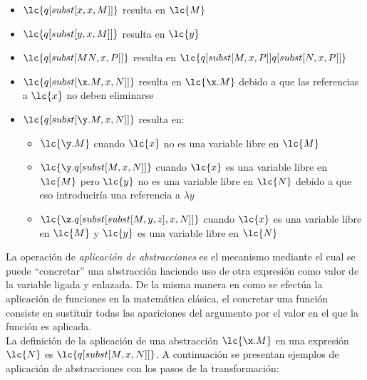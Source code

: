 \begin{itemize}
\item \(\lc{q[subst[x,x,M]]}\) resulta en \(\lc{M}\)
\item \(\lc{q[subst[y,x,M]]}\) resulta en \(\lc{y}\)
\item \(\lc{q[subst[M N, x, P]]}\) resulta en \(\lc{q[subst[M, x, P]] q[subst[N,
    x, P]]}\)
\item \(\lc{q[subst[\x.M, x, N]]}\) resulta en \(\lc{\x.M}\) debido a que las
  referencias a \(\lc{x}\) no deben eliminarse
\item \(\lc{q[subst[\y.M, x, N]]}\) resulta en:
  \begin{itemize}
  \item \(\lc{\y.M}\) cuando \(\lc{x}\) no es una variable libre en \(\lc{M}\)
  \item \(\lc{\y.q[subst[M, x, N]]}\) cuando \(\lc{x}\) es una variable libre en
    \(\lc{M}\) pero \(\lc{y}\) no es una variable libre en \(\lc{N}\) debido a que
    eso introduciría una referencia a \(\lambda y\)
  \item \(\lc{\z.q[subst[subst[M,y,z],x,N]]}\) cuando \(\lc{x}\) es una variable
    libre en \(\lc{M}\) y \(\lc{y}\) es una variable libre en \(\lc{N}\)
  \end{itemize}
\end{itemize}

La operación de \emph{aplicación de abstracciones} es el mecanismo mediante el cual
se puede ``concretar'' una abstracción haciendo uso de otra expresión como valor
de la variable ligada y enlazada. De la misma manera en como se efectúa la
aplicación de funciones en la matemática clásica, el concretar una función
consiste en sustituír todas las apariciones del argumento por el valor en el que
la función es aplicada. \\

La definición de la aplicación de una abstracción \(\lc{\x.M}\) en una expresión
\(\lc{N}\) es \(\lc{q[subst[M,x,N]]}\). A continuación se presentan ejemplos de
aplicación de abstracciones con los pasos de la transformación: \\

